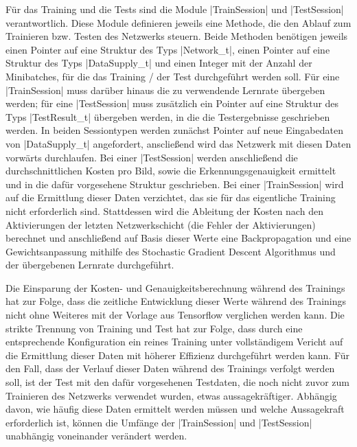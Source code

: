\documentclass[../main.tex]{subfiles}
\begin{document}
Für das Training und die Tests sind die Module |TrainSession| und |TestSession| verantwortlich. Diese Module definieren jeweils eine Methode, die den Ablauf zum Trainieren bzw. Testen des Netzwerks steuern. Beide Methoden benötigen jeweils einen Pointer auf eine Struktur des Typs |Network_t|, einen Pointer auf eine Struktur des Typs |DataSupply_t| und einen Integer mit der Anzahl der Minibatches, für die das Training / der Test durchgeführt werden soll. Für eine |TrainSession| muss darüber hinaus die zu verwendende Lernrate übergeben werden; für eine |TestSession| muss zusätzlich ein Pointer auf eine Struktur des Typs |TestResult_t| übergeben werden, in die die Testergebnisse geschrieben werden. In beiden Sessiontypen werden zunächst Pointer auf neue Eingabedaten von |DataSupply_t| angefordert, anscließend wird das Netzwerk mit diesen Daten vorwärts durchlaufen. Bei einer |TestSession| werden anschließend die durchschnittlichen Kosten pro Bild, sowie die Erkennungsgenauigkeit ermittelt und in die dafür vorgesehene Struktur geschrieben. Bei einer |TrainSession| wird auf die Ermittlung dieser Daten verzichtet, das sie für das eigentliche Training nicht erforderlich sind. Stattdessen wird die Ableitung der Kosten nach den Aktivierungen der letzten Netzwerkschicht (die Fehler der Aktivierungen) berechnet und anschließend auf Basis dieser Werte eine Backpropagation und eine Gewichtsanpassung mithilfe des Stochastic Gradient Descent Algorithmus und der übergebenen Lernrate durchgeführt. 

Die Einsparung der Kosten- und Genauigkeitsberechnung während des Trainings hat zur Folge, dass die zeitliche Entwicklung dieser Werte während des Trainings nicht ohne Weiteres mit der Vorlage aus Tensorflow verglichen werden kann. Die strikte Trennung von Training und Test hat zur Folge, dass durch eine entsprechende Konfiguration ein reines Training unter vollständigem Vericht auf die Ermittlung dieser Daten mit höherer Effizienz durchgeführt werden kann. Für den Fall, dass der Verlauf dieser Daten während des Trainings verfolgt werden soll, ist der Test mit den dafür vorgesehenen Testdaten, die noch nicht zuvor zum Trainieren des Netzwerks verwendet wurden, etwas aussagekräftiger. Abhängig davon, wie häufig diese Daten ermittelt werden müssen und welche Aussagekraft erforderlich ist, können die Umfänge der |TrainSession| und |TestSession| unabhängig voneinander verändert werden. 
\end{document}
